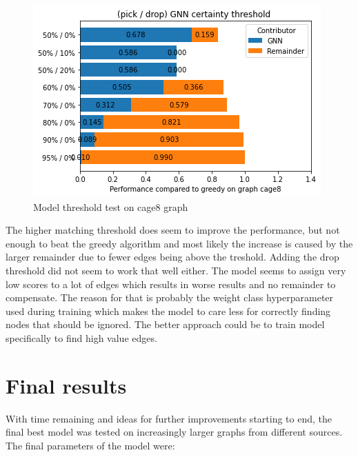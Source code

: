 \begin{figure}[H]
    \centering
    \includegraphics[scale=1.0]{figures/ThresholdDemo}
    \caption{Model threshold test on cage8 graph}
    \label{Model threshold test}
\end{figure}

The higher matching threshold does seem to improve the performance, but not enough to beat the greedy algorithm and most likely the increase is caused by the larger remainder due to fewer edges being above the treshold. Adding the drop threshold did not seem to work that well either. The model seems to assign very low scores to a lot of edges which results in worse results and no remainder to compensate. The reason for that is probably the weight class hyperparameter used during training which makes the model to care less for correctly finding nodes that should be ignored. The better approach could be to train model specifically to find high value edges.

\section{Final results}

With time remaining and ideas for further improvements starting to end, the final best model was tested on increasingly larger graphs from different sources. The final parameters of the model were:

